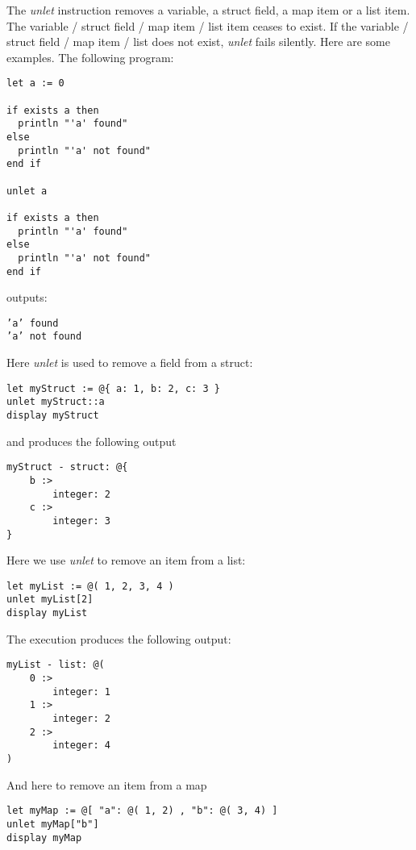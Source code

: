 \documentclass[11pt]{article}
\begin{document}
{The {\em unlet} instruction removes a variable, a struct field, a map item or a list item. The variable / struct field / map item / list item ceases to exist. If the variable / struct field / map item / list does not exist, {\em unlet} fails silently. Here are some examples. The following program:

\begin{lstlisting}
let a := 0

if exists a then
  println "'a' found"
else
  println "'a' not found"
end if

unlet a

if exists a then
  println "'a' found"
else
  println "'a' not found"
end if
\end{lstlisting}

outputs:

{\small
\begin{verbatim}
’a’ found
’a’ not found
\end{verbatim}
}

Here {\em unlet} is used to remove a field from a struct:

\begin{lstlisting}
let myStruct := @{ a: 1, b: 2, c: 3 }
unlet myStruct::a
display myStruct
\end{lstlisting} 

and produces the following output

{\small
\begin{verbatim}
myStruct - struct: @{
    b :>
        integer: 2
    c :>
        integer: 3
}
\end{verbatim}
}

Here we use {\em unlet} to remove an item from a list:

\begin{lstlisting}
let myList := @( 1, 2, 3, 4 )
unlet myList[2]
display myList
\end{lstlisting}

The execution produces the following output:

{\small
\begin{verbatim}
myList - list: @(
    0 :>
        integer: 1
    1 :>
        integer: 2
    2 :>
        integer: 4
)
\end{verbatim}
}

And here to remove an item from a map

\begin{lstlisting}
let myMap := @[ "a": @( 1, 2) , "b": @( 3, 4) ]
unlet myMap["b"]
display myMap
\end{lstlisting}

}
\end{document}
